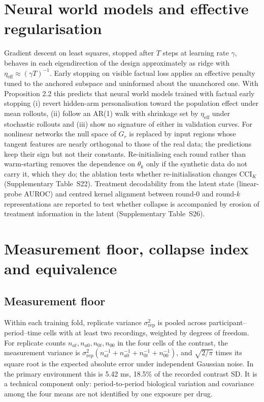 \documentclass[11pt,a4paper]{article}
\newcommand{\CCI}{\mathrm{CCI}}
\begin{document}
\section{Neural world models and effective regularisation}
Gradient descent on least squares, stopped after $T$ steps at learning rate $\gamma$, behaves in each eigendirection of the design approximately as ridge with $\eta_{\mathrm{eff}}\approx(\gamma T)^{-1}$\cite{ali2019earlystopping}. Early stopping on visible factual loss applies an effective penalty tuned to the anchored subspace and uninformed about the unanchored one. With Proposition 2.2 this predicts that neural world models trained with factual early stopping (i) revert hidden-arm personalisation toward the population effect under mean rollouts, (ii) follow an AR(1) walk with shrinkage set by $\eta_{\mathrm{eff}}$ under stochastic rollouts and (iii) show no signature of either in validation curves. For nonlinear networks the null space of $G_r$ is replaced by input regions whose tangent features are nearly orthogonal to those of the real data; the predictions keep their sign but not their constants. Re-initialising each round rather than warm-starting removes the dependence on $\theta_k$ only if the synthetic data do not carry it, which they do; the ablation tests whether re-initialisation changes $\CCI_K$ (Supplementary Table~S22). Treatment decodability from the latent state (linear-probe AUROC) and centred kernel alignment between round-0 and round-$k$ representations\cite{kornblith2019cka} are reported to test whether collapse is accompanied by erosion of treatment information in the latent (Supplementary Table~S26).

\section{Measurement floor, collapse index and equivalence}
\subsection{Measurement floor}
Within each training fold, replicate variance $\sigma^2_{\mathrm{rep}}$ is pooled across participant--period--time cells with at least two recordings, weighted by degrees of freedom. For replicate counts $n_{at},n_{a0},n_{0t},n_{00}$ in the four cells of the contrast, the measurement variance is $\sigma^2_{\mathrm{rep}}(n_{at}^{-1}+n_{a0}^{-1}+n_{0t}^{-1}+n_{00}^{-1})$, and $\sqrt{2/\pi}$ times its square root is the expected absolute error under independent Gaussian noise. In the primary environment this is 5.42 ms, 18.5\% of the recorded contrast SD. It is a technical component only: period-to-period biological variation and covariance among the four means are not identified by one exposure per drug\cite{senn2002crossover}.
\end{document}
